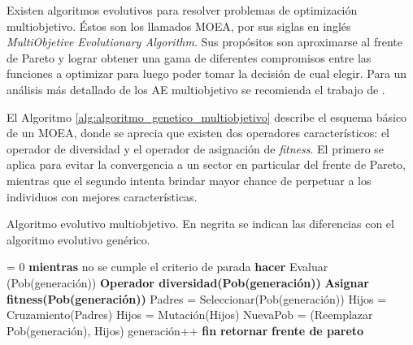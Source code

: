 Existen algoritmos evolutivos para resolver problemas de optimización multiobjetivo. 
Éstos son los llamados MOEA, por sus siglas en inglés \emph{ MultiObjetive Evolutionary Algorithm}. Sus propósitos son aproximarse al frente de Pareto y lograr obtener una gama de diferentes compromisos entre las funciones a optimizar para luego poder tomar la decisión de cual elegir. Para un análisis más detallado de los AE multiobjetivo se recomienda el trabajo de \citet{Deb2001}.


El Algoritmo \ref{alg:algoritmo_genetico_multiobjetivo} describe el esquema básico de un MOEA, donde se aprecia que existen dos operadores característicos: el operador de diversidad y el operador de asignación de \emph{fitness}. El primero se aplica para evitar la convergencia a un sector en particular del frente de Pareto, mientras que el segundo intenta brindar mayor chance de perpetuar a los individuos con mejores características.

\begin{algorithm}[ht]
	\caption[Algoritmo evolutivo multiobjetivo]{Algoritmo evolutivo multiobjetivo. En negrita se indican las diferencias con el algoritmo evolutivo genérico.}
	\label{alg:algoritmo_genetico_multiobjetivo}
	\begin{algorithmic} [1] 
		{
			 = 0
			\STATE \textbf{mientras} {no se cumple el criterio de parada} \textbf{hacer}
			\STATE\hspace{\algorithmicindent} {Evaluar (Pob(generación))}
			\STATE\hspace{\algorithmicindent} \textbf{Operador diversidad(Pob(generación))}
			\STATE\hspace{\algorithmicindent} \textbf{Asignar fitness(Pob(generación))}						
			\STATE\hspace{\algorithmicindent} {Padres = Seleccionar(Pob(generación))}
			\STATE\hspace{\algorithmicindent} {Hijos = Cruzamiento(Padres)}
			\STATE\hspace{\algorithmicindent} {Hijos = Mutación(Hijos)}
			\STATE\hspace{\algorithmicindent} {NuevaPob = (Reemplazar Pob(generación), Hijos)}
			\STATE\hspace{\algorithmicindent} {generación}++
			\STATE \textbf{fin}
			\STATE \textbf{retornar} \textbf{frente de pareto}
		}
	\end{algorithmic}
\end{algorithm}

